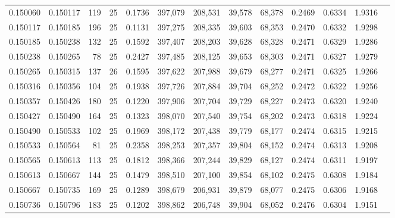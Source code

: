 \begin{tabular}{rrrrrrrrrrrrr}
0.150060 & 0.150117 &   119 &  25 &                                     0.1736 & 397,079 & 208,531 &  39,578 &  68,378 & 0.2469 & 0.6334 & 1.9316 \\
0.150117 & 0.150185 &   196 &  25 &                                     0.1131 & 397,275 & 208,335 &  39,603 &  68,353 & 0.2470 & 0.6332 & 1.9298 \\
0.150185 & 0.150238 &   132 &  25 &                                     0.1592 & 397,407 & 208,203 &  39,628 &  68,328 & 0.2471 & 0.6329 & 1.9286 \\
0.150238 & 0.150265 &    78 &  25 &                                     0.2427 & 397,485 & 208,125 &  39,653 &  68,303 & 0.2471 & 0.6327 & 1.9279 \\
0.150265 & 0.150315 &   137 &  26 &                                     0.1595 & 397,622 & 207,988 &  39,679 &  68,277 & 0.2471 & 0.6325 & 1.9266 \\
0.150316 & 0.150356 &   104 &  25 &                                     0.1938 & 397,726 & 207,884 &  39,704 &  68,252 & 0.2472 & 0.6322 & 1.9256 \\
0.150357 & 0.150426 &   180 &  25 &                                     0.1220 & 397,906 & 207,704 &  39,729 &  68,227 & 0.2473 & 0.6320 & 1.9240 \\
0.150427 & 0.150490 &   164 &  25 &                                     0.1323 & 398,070 & 207,540 &  39,754 &  68,202 & 0.2473 & 0.6318 & 1.9224 \\
0.150490 & 0.150533 &   102 &  25 &                                     0.1969 & 398,172 & 207,438 &  39,779 &  68,177 & 0.2474 & 0.6315 & 1.9215 \\
0.150533 & 0.150564 &    81 &  25 &                                     0.2358 & 398,253 & 207,357 &  39,804 &  68,152 & 0.2474 & 0.6313 & 1.9208 \\
0.150565 & 0.150613 &   113 &  25 &                                     0.1812 & 398,366 & 207,244 &  39,829 &  68,127 & 0.2474 & 0.6311 & 1.9197 \\
0.150613 & 0.150667 &   144 &  25 &                                     0.1479 & 398,510 & 207,100 &  39,854 &  68,102 & 0.2475 & 0.6308 & 1.9184 \\
0.150667 & 0.150735 &   169 &  25 &                                     0.1289 & 398,679 & 206,931 &  39,879 &  68,077 & 0.2475 & 0.6306 & 1.9168 \\
0.150736 & 0.150796 &   183 &  25 &                                     0.1202 & 398,862 & 206,748 &  39,904 &  68,052 & 0.2476 & 0.6304 & 1.9151 \\

\end{tabular}
